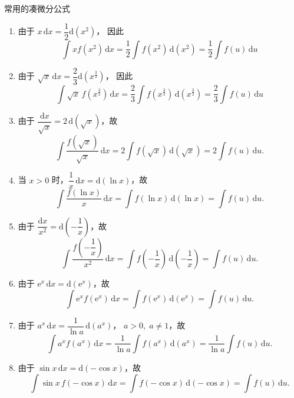 \documentclass[a4paper,12pt]{article}
\begin{document}
    常用的凑微分公式
    \begin{enumerate}
        \item 由于 $x\,\mathrm{d}x = \dfrac{1}{2}\mathrm{d}(x^2)$，
        因此
        \[
            \int x f(x^2)\,\mathrm{d}x
            = \frac{1}{2}\int f(x^2)\,\mathrm{d}(x^2)
            = \frac{1}{2}\int f(u)\,\mathrm{d}u
        \]

        \item 由于 $\sqrt{x}\,\mathrm{d}x = \dfrac{2}{3}\mathrm{d}(x^{\frac{3}{2}})$，
        因此
        \[
            \int \sqrt{x}\, f(x^{\frac{3}{2}})\,\mathrm{d}x
            = \frac{2}{3}\int f(x^{\frac{3}{2}})\,\mathrm{d}(x^{\frac{3}{2}})
            = \frac{2}{3}\int f(u)\,\mathrm{d}u
        \]

        \item 由于 $\dfrac{\mathrm{d}x}{\sqrt{x}} = 2\,\mathrm{d}(\sqrt{x})$，故
        \[
            \int \frac{f(\sqrt{x})}{\sqrt{x}}\,\mathrm{d}x
            = 2\int f(\sqrt{x})\,\mathrm{d}(\sqrt{x})
            = 2\int f(u)\,\mathrm{d}u.
        \]

        \item 当 $x>0$ 时，$\dfrac{1}{x}\,\mathrm{d}x = \mathrm{d}(\ln x)$，故
        \[
            \int \frac{f(\ln x)}{x}\,\mathrm{d}x
            = \int f(\ln x)\,\mathrm{d}(\ln x)
            = \int f(u)\,\mathrm{d}u.
        \]

        \item 由于 $\dfrac{\mathrm{d}x}{x^2} = \mathrm{d}\!\left(-\dfrac{1}{x}\right)$，故
        \[
            \int \frac{f\!\left(-\dfrac{1}{x}\right)}{x^2}\,\mathrm{d}x
            = \int f\!\left(-\dfrac{1}{x}\right)\,\mathrm{d}\!\left(-\dfrac{1}{x}\right)
            = \int f(u)\,\mathrm{d}u.
        \]

        \item 由于 $\mathrm{e}^x\,\mathrm{d}x = \mathrm{d}(\mathrm{e}^x)$，故
        \[
            \int \mathrm{e}^x f(\mathrm{e}^x)\,\mathrm{d}x
            = \int f(\mathrm{e}^x)\,\mathrm{d}(\mathrm{e}^x)
            = \int f(u)\,\mathrm{d}u.
        \]

        \item 由于 $a^x\,\mathrm{d}x = \dfrac{1}{\ln a}\,\mathrm{d}(a^x)$，
        $a>0,\; a\ne1$，故
        \[
            \int a^x f(a^x)\,\mathrm{d}x
            = \frac{1}{\ln a}\int f(a^x)\,\mathrm{d}(a^x)
            = \frac{1}{\ln a}\int f(u)\,\mathrm{d}u.
        \]

        \item 由于 $\sin x\,\mathrm{d}x = \mathrm{d}(-\cos x)$，故
        \[
            \int \sin x\,f(-\cos x)\,\mathrm{d}x
            = \int f(-\cos x)\,\mathrm{d}(-\cos x)
            = \int f(u)\,\mathrm{d}u.
        \]


\end{enumerate}
\end{document}
